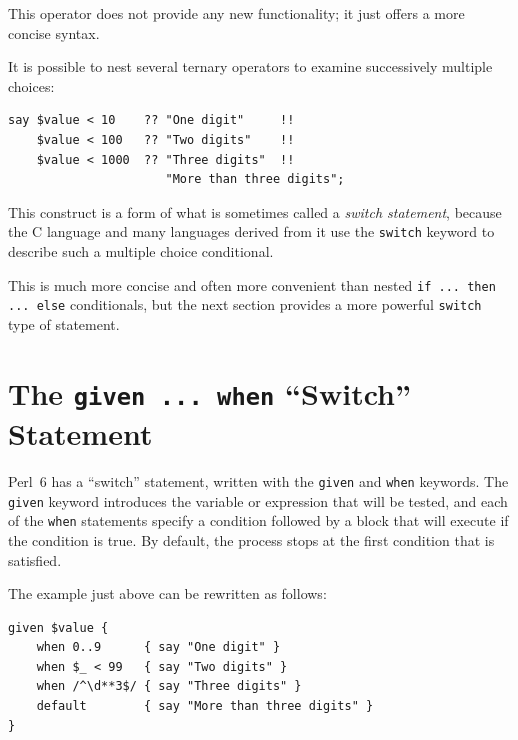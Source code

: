 This operator does not provide any new functionality; it just 
offers a more concise syntax.

It is possible to nest several ternary operators to examine 
successively multiple choices:

\begin{verbatim}
say $value < 10    ?? "One digit"     !! 
    $value < 100   ?? "Two digits"    !!
    $value < 1000  ?? "Three digits"  !!
                      "More than three digits";
\end{verbatim}

This construct is a form of what is sometimes called a 
\emph{switch statement}, because the C language and 
many languages derived from it use the {\tt switch} keyword 
to describe such a multiple choice conditional.

This is much more concise and often more convenient than nested 
{\tt if ... then ... else} conditionals, but the next section 
provides a more powerful {\tt switch} type of statement.

\section{The {\tt given ... when} ``Switch'' Statement}
\label{given_when}

Perl~6 has a ``switch'' statement, written with the 
{\tt given} and {\tt when} keywords. The 
{\tt given} keyword introduces the variable or expression 
that will be tested, and each of the {\tt when} 
statements specify a condition followed by a block that 
will execute if the condition is true. By default, the 
process stops at the first condition that is satisfied.

The example just above can be rewritten as follows:

\begin{verbatim}
given $value {
    when 0..9      { say "One digit" }
    when $_ < 99   { say "Two digits" }
    when /^\d**3$/ { say "Three digits" }
    default        { say "More than three digits" }
}
\end{verbatim}

